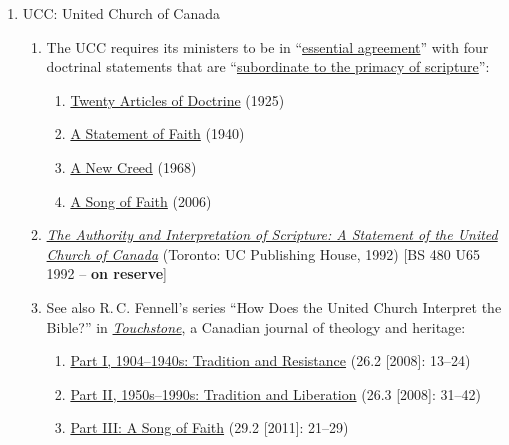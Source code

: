 \documentclass[titlepage]{article}
\begin{document}
\begin{enumerate}
\item UCC: United Church of Canada

	\begin{enumerate}
	\item The UCC requires its ministers to be in ``\href{http://www.united-church.ca/community-faith/welcome-united-church-canada/what-we-believe}{essential agreement}'' with four doctrinal statements that are ``\href{http://www.united-church.ca/community-faith/welcome-united-church-canada/faith-statements}{subordinate to the primacy of scripture}'':
		\begin{enumerate}
			\item\href{http://www.united-church.ca/community-faith/welcome-united-church-canada/twenty-articles-doctrine-1925}{Twenty Articles of Doctrine} (1925)
			\item\href{http://www.united-church.ca/community-faith/welcome-united-church-canada/statement-faith-1940}{A Statement of Faith} (1940)
			\item\href{http://www.united-church.ca/community-faith/welcome-united-church-canada/new-creed}{A New Creed} (1968)
			\item\href{http://www.united-church.ca/community-faith/welcome-united-church-canada/song-faith}{A Song of Faith} (2006)
		\end{enumerate}
	\item \href{https://ecumenism.net/archive/docu/1992_ucc_authority_interpretation_scripture.pdf}{\emph{The Authority and Interpretation of Scripture: A Statement of the United Church of Canada}} (Toronto: UC Publishing House, 1992) [BS 480 U65 1992 -- \textbf{on reserve}]
	\item See also R.\,C. Fennell's series “How Does the United Church Interpret the Bible?” in \href{http://touchstonecanada.ca}{\emph{Touchstone}}, a Canadian journal of theology and heritage:
		\begin{enumerate}
			\item\href{http://touchstonecanada.ca/wp-content/uploads/2013/08/Article2_2008-051.pdf}{Part I, 1904–1940s: Tradition and Resistance} (26.2 [2008]: 13--24)
			\item\href{http://touchstonecanada.ca/wp-content/uploads/2013/08/3rdArticle_2008-09.pdf}{Part II, 1950s–1990s: Tradition and Liberation} (26.3 [2008]: 31--42)
			\item\href{http://touchstonecanada.ca/wp-content/uploads/2013/08/Touchstone_May_2011.pdf}{Part III: A Song of Faith} (29.2 [2011]: 21--29)
		\end{enumerate}
	\end{enumerate}

\end{enumerate}
\end{document}
